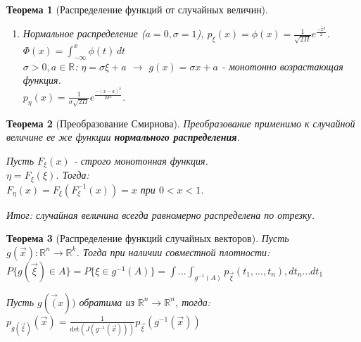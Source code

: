 \documentclass[14pt]{extarticle}
\theoremstyle{breakstyle}
\newtheorem{theorem}{Теорема}[subsection]
\begin{document}
\begin{theorem}[Распределение функций от случайных величин]
\begin{enumerate}
    \item Нормальное распределение ($a = 0, \sigma = 1$), $p_{\xi}(x) = \phi(x) = \frac{1}{\sqrt{2\Pi}}e^{\frac{-x^{2}}{2}}$.\\
          $\Phi(x) = \int_{-\infty}^{x}\phi(t) \, dt$ \\
          $\sigma > 0, a \in \mathbb{R}$: $\eta = \sigma \xi + a$ $\rightarrow$ $g(x) = \sigma x + a$ - монотонно возрастающая функция.\\
          $p_{\eta}(x) = \frac{1}{\sigma \sqrt{2\Pi}}e^{\frac{-(x-a)^2}{2\sigma^{2}}}$.
\end{enumerate}

\end{theorem}

\begin{theorem}[Преобразование Смирнова]

Преобразование применимо к случайной величине ее же функции \textbf{нормального распределения}.

\vspace{\baselineskip}

Пусть $F_{\xi}(x)$ - строго монотонная функция.\\
$\eta = F_{\xi}(\xi)$. Тогда:\\
$F_{\eta}(x) = F_{\xi}(F_{\xi}^{-1}(x)) = x$ при $0 < x < 1$.

\vspace{\baselineskip}

Итог: случайная величина всегда равномерно распределена по отрезку.

\end{theorem}

\begin{theorem}[Распределение функций случайных векторов]

Пусть $g(\vec{x}): \mathbb{R}^{n} \rightarrow \mathbb{R}^{k}$. Тогда при наличии совместной плотности:\\
$P\{g(\vec{\xi}) \in A\} = P\{\xi \in g^{-1}(A)\} = \int ... \int_{g^{-1}(A)} p_{\vec{\xi}}(t_1, ..., t_n) , dt_n ... dt_1$

\vspace{\baselineskip}

Пусть $g(\vec(x))$ обратима из $\mathbb{R}^{n} \rightarrow \mathbb{R}^{n}$, тогда:\\
$p_{g(\vec{\xi})}(\vec{x}) = \frac{1}{\text{det}(J(g^{-1}(\vec{x})))}p_{\vec{\xi}}(g^{-1}(\vec{x}))$

\end{theorem}
\end{document}

